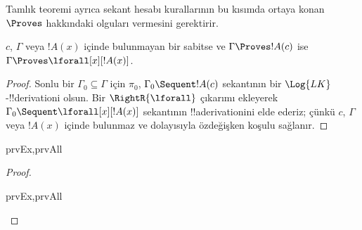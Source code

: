 


\begin{explain}
  Tamlık teoremi ayrıca sekant hesabı kurallarının bu kısımda ortaya konan
  $\Proves$ hakkındaki olguları vermesini gerektirir.
\end{explain}

\begin{thm}
 $c$, $\Gamma$ veya $!A(x)$ içinde
bulunmayan bir sabitse ve $\Gamma\Proves !A(c)$ ise $\Gamma\Proves
\lforall[x][!A(x)]$.
\end{thm}

\begin{proof}
Sonlu bir $\Gamma_0\subseteq\Gamma$ için $\pi_0$, $\Gamma_0\Sequent !A(c)$
sekantının bir $\Log{LK}$-!!{derivation}{}i olsun. Bir $\RightR{\lforall}$
çıkarımı ekleyerek $\Gamma_0\Sequent\lforall[x][!A(x)]$ sekantının
!!a{derivation}{}ini elde ederiz; çünkü $c$, $\Gamma$ veya $!A(x)$ içinde
bulunmaz ve dolayısıyla özdeğişken koşulu sağlanır.
\end{proof}

\begin{prop}
\begin{tagenumerate}{prvEx,prvAll}
\end{tagenumerate}
\end{prop}

\begin{proof}
\begin{tagenumerate}{prvEx,prvAll}
\end{tagenumerate}
\end{proof}

